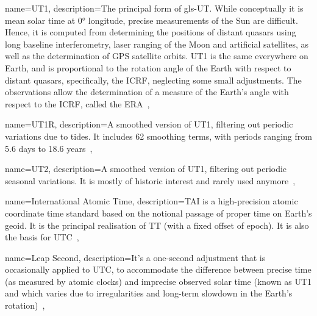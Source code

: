  {
	name={UT1},
	description={The principal form of \gls{gls-UT}. While conceptually it is mean solar time at 0° longitude, precise measurements of the Sun are difficult. Hence, it is computed from determining the positions of distant quasars using long baseline interferometry, laser ranging of the Moon and artificial satellites, as well as the determination of GPS satellite orbits. UT1 is the same everywhere on Earth, and is proportional to the rotation angle of the Earth with respect to distant quasars, specifically, the \gls{ICRF}, neglecting some small adjustments. The observations allow the determination of a measure of the Earth's angle with respect to the \gls{ICRF}, called the \gls{ERA}~\cite{UniversalTime2020}},
}

 {
	name={UT1R},
	description={A smoothed version of \gls{UT1}, filtering out periodic variations due to tides. It includes 62 smoothing terms, with periods ranging from 5.6 days to 18.6 years~\cite{UniversalTime2020}},
}

 {
	name={UT2},
	description={A smoothed version of \gls{UT1}, filtering out periodic seasonal variations. It is mostly of historic interest and rarely used anymore~\cite{UniversalTime2020}},
}

 {
	name={International Atomic Time},
	description={\acrshort{TAI} is a high-precision atomic coordinate time standard based on the notional passage of proper time on Earth's geoid. It is the principal realisation of \gls{TT} (with a fixed offset of epoch). It is also the basis for \gls{UTC}~\cite{InternationalAtomicTime2020}},
}

 {
	name={Leap Second},
	description={It's a one-second adjustment that is occasionally applied to \gls{UTC}, to accommodate the difference between precise time (as measured by atomic clocks) and imprecise observed solar time (known as \gls{UT1} and which varies due to irregularities and long-term slowdown in the Earth's rotation)~\cite{LeapSecond2021}},
}

